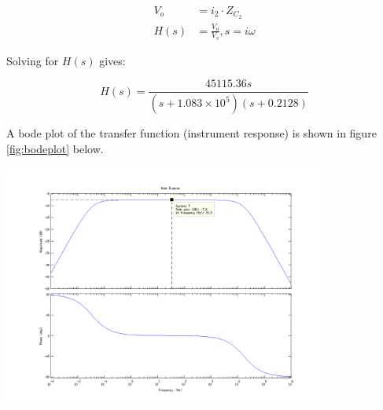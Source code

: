 \documentclass[a4paper]{article}
\begin{document}
\begin{multicols}{2}
\begin{align}
  \label{eqn:vo}
  V_o &= i_2 \cdot Z_{C_2} \\
  H(s) &= \frac{V_o}{V_s}, s = i\omega
\end{align}

Solving for $H(s)$ gives:

\begin{equation}
  H(s) = \frac{45115.36 s}
  { (s + 1.083 \times 10^5)
    (s + 0.2128) }
  \label{eqn:transferfunction}
\end{equation}

A bode plot of the transfer function (instrument response) is shown in
figure \ref{fig:bodeplot} below.

\end{multicols}
  \begin{center}
    \includegraphics[width=400px]{bodeplot.png}
  \end{center}
  \label{fig:bodeplot}
\end{document}
